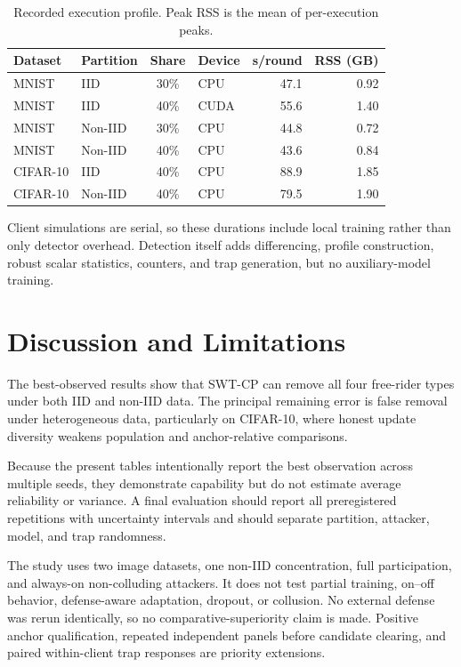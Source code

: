 \documentclass[conference]{IEEEtran}
\begin{document}
\begin{table}[t]
\centering
\caption{Recorded execution profile. Peak RSS is the mean of per-execution peaks.}
\label{tab:cost}
\footnotesize
\setlength{\tabcolsep}{2.5pt}
\begin{tabular}{llclrr}
\toprule
Dataset & Partition & Share & Device & s/round & RSS (GB) \\
\midrule
MNIST & IID     & 30\% & CPU  & 47.1 & 0.92 \\
MNIST & IID     & 40\% & CUDA & 55.6 & 1.40 \\
MNIST & Non-IID & 30\% & CPU  & 44.8 & 0.72 \\
MNIST & Non-IID & 40\% & CPU  & 43.6 & 0.84 \\
CIFAR-10 & IID     & 40\% & CPU & 88.9 & 1.85 \\
CIFAR-10 & Non-IID & 40\% & CPU & 79.5 & 1.90 \\
\bottomrule
\end{tabular}
\end{table}

Client simulations are serial, so these durations include local training rather than only detector overhead. Detection itself adds differencing, profile construction, robust scalar statistics, counters, and trap generation, but no auxiliary-model training.

\section{Discussion and Limitations}
The best-observed results show that SWT-CP can remove all four free-rider types under both IID and non-IID data. The principal remaining error is false removal under heterogeneous data, particularly on CIFAR-10, where honest update diversity weakens population and anchor-relative comparisons.

Because the present tables intentionally report the best observation across multiple seeds, they demonstrate capability but do not estimate average reliability or variance. A final evaluation should report all preregistered repetitions with uncertainty intervals and should separate partition, attacker, model, and trap randomness.

The study uses two image datasets, one non-IID concentration, full participation, and always-on non-colluding attackers. It does not test partial training, on--off behavior, defense-aware adaptation, dropout, or collusion. No external defense was rerun identically, so no comparative-superiority claim is made. Positive anchor qualification, repeated independent panels before candidate clearing, and paired within-client trap responses are priority extensions.
\end{document}
